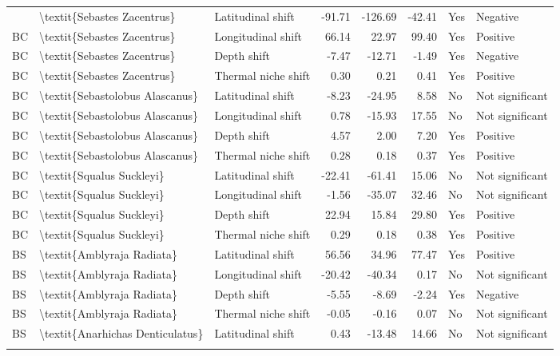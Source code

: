 \begin{longtable}[t]{lllrrrll}
{{BC & \textbackslash{}textit\{Sebastes Zacentrus\} & Latitudinal shift & -91.71 & -126.69 & -42.41 & Yes & Negative\\
BC & \textbackslash{}textit\{Sebastes Zacentrus\} & Longitudinal shift & 66.14 & 22.97 & 99.40 & Yes & Positive\\
BC & \textbackslash{}textit\{Sebastes Zacentrus\} & Depth shift & -7.47 & -12.71 & -1.49 & Yes & Negative\\
BC & \textbackslash{}textit\{Sebastes Zacentrus\} & Thermal niche shift & 0.30 & 0.21 & 0.41 & Yes & Positive\\
\addlinespace
BC & \textbackslash{}textit\{Sebastolobus Alascanus\} & Latitudinal shift & -8.23 & -24.95 & 8.58 & No & Not significant\\
BC & \textbackslash{}textit\{Sebastolobus Alascanus\} & Longitudinal shift & 0.78 & -15.93 & 17.55 & No & Not significant\\
BC & \textbackslash{}textit\{Sebastolobus Alascanus\} & Depth shift & 4.57 & 2.00 & 7.20 & Yes & Positive\\
BC & \textbackslash{}textit\{Sebastolobus Alascanus\} & Thermal niche shift & 0.28 & 0.18 & 0.37 & Yes & Positive\\
BC & \textbackslash{}textit\{Squalus Suckleyi\} & Latitudinal shift & -22.41 & -61.41 & 15.06 & No & Not significant\\
\addlinespace
BC & \textbackslash{}textit\{Squalus Suckleyi\} & Longitudinal shift & -1.56 & -35.07 & 32.46 & No & Not significant\\
BC & \textbackslash{}textit\{Squalus Suckleyi\} & Depth shift & 22.94 & 15.84 & 29.80 & Yes & Positive\\
BC & \textbackslash{}textit\{Squalus Suckleyi\} & Thermal niche shift & 0.29 & 0.18 & 0.38 & Yes & Positive\\
BS & \textbackslash{}textit\{Amblyraja Radiata\} & Latitudinal shift & 56.56 & 34.96 & 77.47 & Yes & Positive\\
BS & \textbackslash{}textit\{Amblyraja Radiata\} & Longitudinal shift & -20.42 & -40.34 & 0.17 & No & Not significant\\
\addlinespace
BS & \textbackslash{}textit\{Amblyraja Radiata\} & Depth shift & -5.55 & -8.69 & -2.24 & Yes & Negative\\
BS & \textbackslash{}textit\{Amblyraja Radiata\} & Thermal niche shift & -0.05 & -0.16 & 0.07 & No & Not significant\\
BS & \textbackslash{}textit\{Anarhichas Denticulatus\} & Latitudinal shift & 0.43 & -13.48 & 14.66 & No & Not significant\\
}}
\end{longtable}
